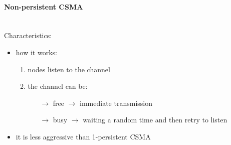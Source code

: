 \paragraph{Non-persistent CSMA}\mbox{}\\[0.2cm]
Characteristics:
\begin{itemize}
    \item how it works:
    \begin{enumerate}
        \item nodes listen to the channel
        \item the channel can be:
        \begin{itemize}
            \item[$\rightarrow$] free $\rightarrow$ immediate transmission
            \item[$\rightarrow$] busy $\rightarrow$ waiting a random time and then retry to listen
        \end{itemize}
    \end{enumerate}
    \item it is less aggressive than 1-persistent CSMA
\end{itemize}


